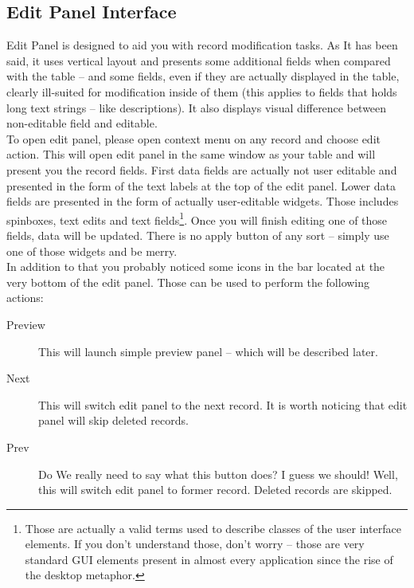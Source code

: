 \subsection{Edit Panel Interface}
Edit Panel is designed to aid you with record modification tasks. As It has been said, it uses vertical layout and presents some additional fields when compared with the table -- and some fields, even if they are actually displayed in the table, clearly ill-suited for modification inside of them (this applies to fields that holds long text strings -- like descriptions). It also displays visual difference between non-editable field and editable.\\
To open edit panel, please open context menu on any record and choose edit action. This will open edit panel in the same window as your table and will present you the record fields. First data fields are actually not user editable and presented in the form of the text labels at the top of the edit panel. Lower data fields are presented in the form of actually user-editable widgets. Those includes spinboxes, text edits and text fields\footnote{Those are actually a valid terms used to describe classes of the user interface elements. If you don't understand those, don't worry -- those are very standard {GUI} elements present in almost every application since the rise of the desktop metaphor.}. Once you will finish editing one of those fields, data will be updated. There is no apply button of any sort -- simply use one of those widgets and be merry.\\
In addition to that you probably noticed some icons in the bar located at the very bottom of the edit panel. Those can be used to perform the following actions:

\begin{description}
  \item[Preview] This will launch simple preview panel -- which will be described later.
  \item[Next] This will switch edit panel to the next record. It is worth noticing that edit panel will skip deleted records.
  \item[Prev] Do We really need to say what this button does? I guess we should! Well, this will switch edit panel to former record. Deleted records are skipped.
\end{description}

